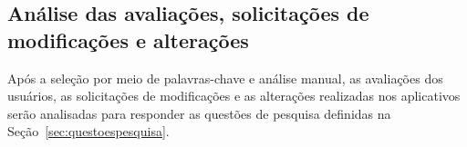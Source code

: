 \subsection{Análise das avaliações, solicitações de modificações e alterações}
\label{sec:analise}

Após a seleção por meio de palavras-chave e análise manual, 
as avaliações dos usuários, as solicitações de modificações e as alterações realizadas nos aplicativos serão analisadas para responder as questões de pesquisa definidas na Seção~\ref{sec:questoespesquisa}.


	
	
	
	

